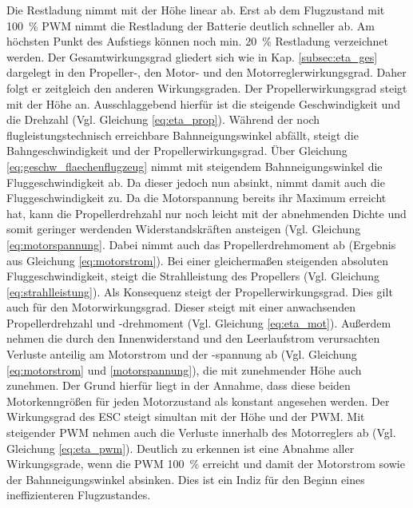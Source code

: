 Die Restladung nimmt mit der Höhe linear ab. Erst ab dem Flugzustand mit \SI{100}{\%} PWM nimmt die Restladung der Batterie deutlich schneller ab. Am höchsten Punkt des Aufstiegs können noch min. \SI{20}{\%} Restladung verzeichnet werden.
Der Gesamtwirkungsgrad gliedert sich wie in Kap. \ref{subsec:eta_ges} dargelegt in den Propeller-, den Motor- und den Motorreglerwirkungsgrad. Daher folgt er zeitgleich den anderen Wirkungsgraden. Der Propellerwirkungsgrad steigt mit der Höhe an. Ausschlaggebend hierfür ist die steigende Geschwindigkeit und die Drehzahl (Vgl. Gleichung \ref{eq:eta_prop}). Während der noch flugleistungstechnisch erreichbare Bahnneigungswinkel abfällt, steigt die Bahngeschwindigkeit und der Propellerwirkungsgrad. Über Gleichung \ref{eq:geschw_flaechenflugzeug} nimmt mit steigendem Bahnneigungswinkel die Fluggeschwindigkeit ab. Da dieser jedoch nun absinkt, nimmt damit auch die Fluggeschwindigkeit zu. Da die Motorspannung bereits ihr Maximum erreicht hat, kann die Propellerdrehzahl nur noch leicht mit der abnehmenden Dichte und somit geringer werdenden Widerstandskräften ansteigen (Vgl. Gleichung \ref{eq:motorspannung}. Dabei nimmt auch das Propellerdrehmoment ab (Ergebnis aus Gleichung \ref{eq:motorstrom}). Bei einer gleichermaßen steigenden absoluten Fluggeschwindigkeit, steigt die Strahlleistung des Propellers (Vgl. Gleichung \ref{eq:strahlleistung}). Als Konsequenz steigt der Propellerwirkungsgrad.
Dies gilt auch für den Motorwirkungsgrad. Dieser steigt mit einer anwachsenden Propellerdrehzahl und -drehmoment (Vgl. Gleichung \ref{eq:eta_mot}). Außerdem nehmen die durch den Innenwiderstand und den Leerlaufstrom verursachten Verluste anteilig am Motorstrom und der -spannung ab (Vgl. Gleichung \ref{eq:motorstrom} und \ref{motorspannung}), die mit zunehmender Höhe auch zunehmen. Der Grund hierfür liegt in der Annahme, dass diese beiden Motorkenngrößen für jeden Motorzustand als konstant angesehen werden. Der Wirkungsgrad des ESC steigt simultan mit der Höhe und der PWM. Mit steigender PWM nehmen auch die Verluste innerhalb des Motorreglers ab (Vgl. Gleichung \ref{eq:eta_pwm}). Deutlich zu erkennen ist eine Abnahme aller Wirkungsgrade, wenn die PWM \SI{100}{\%} erreicht und damit der Motorstrom sowie der Bahnneigungswinkel absinken. Dies ist ein Indiz für den Beginn eines ineffizienteren Flugzustandes.



